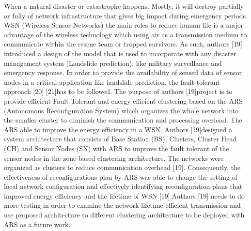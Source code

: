 \documentclass{article}
\begin{document}
When a natural disaster or catastrophe happens. Mostly, it will destroy partially or fully of network infrastructure that gives big impact during emergency periods. WSN (Wireless Sensor Networks) the main roles to reduce human life is a major advantage of the wireless technology which using air as a transmission medium to communicate within the rescue team or trapped survivors. As such, authors [19] introduced a design of the model that is used to incorporate with any disaster management system (Landslide prediction), like military surveillance and emergency response. In order to provide the availability of sensed data of sensor nodes in a critical application like landslide prediction, the fault-tolerant approach [20] [21]has to be followed. The purpose of authors [19]project is to provide efficient Fault Tolerant and energy efficient clustering based on the ARS (Autonomous Reconfiguration System) which organizes the whole network into the smaller cluster to diminish the communication and processing overload. The ARS able to improve the energy efficiency in a WSN. Authors [19]designed a system architecture that consists of Base Station (BS), Clusters, Cluster Head (CH) and Sensor Nodes (SN) with ARS to improve the fault tolerant of the sensor nodes in the zone-based clustering architecture. The networks were organized as clusters to reduce communication overhead [19]. Consequently, the effectiveness of reconfigurations plan by ARS was able to change the setting of local network configuration and effectively identifying reconfiguration plans that improved energy efficiency and the lifetime of WSN [19].Authors [19] needs to do more testing in order to examine the network lifetime efficient transmission and use proposed architecture to different clustering architecture to be deployed with ARS as a future work.
\end{document}
